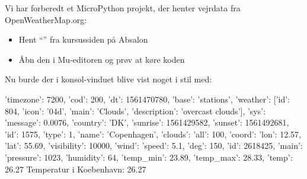 \documentclass{ucph-handout}
\begin{document}
\begin{exercisebox}[adjusted title=Hent vejrdata fra OpenWeatherMap]
\vspace{-2mm}
Vi har forberedt et MicroPython projekt, der henter vejrdata fra OpenWeatherMap.org:
\begin{itemize}
\item Hent ``'' fra kursussiden på Absalon
\item Åbn den i Mu-editoren og prøv at køre koden
\end{itemize}


    


Nu burde der i konsol-vinduet blive vist noget i stil med:
{\tiny
\begin{python}
{'timezone': 7200, 'cod': 200, 'dt': 1561470780, 'base': 'stations',
  'weather': [{'id': 804, 'icon': '04d', 'main': 'Clouds',
               'description': 'overcast clouds'}],
  'sys': {'message': 0.0076, 'country': 'DK',  'sunrise': 1561429582,
          'sunset': 1561492681, 'id': 1575, 'type': 1},
  'name': 'Copenhagen', 'clouds': {'all': 100}, 'coord': {'lon': 12.57, 'lat': 55.69},
  'visibility': 10000, 'wind': {'speed': 5.1, 'deg': 150}, 'id': 2618425,
  'main': {'pressure': 1023, 'humidity': 64, 'temp_min': 23.89,
           'temp_max': 28.33, 'temp': 26.27}}
Temperatur i Koebenhavn: 26.27
\end{python}
}
\vspace{-4mm}
\end{exercisebox}
\noindent
\end{document}
